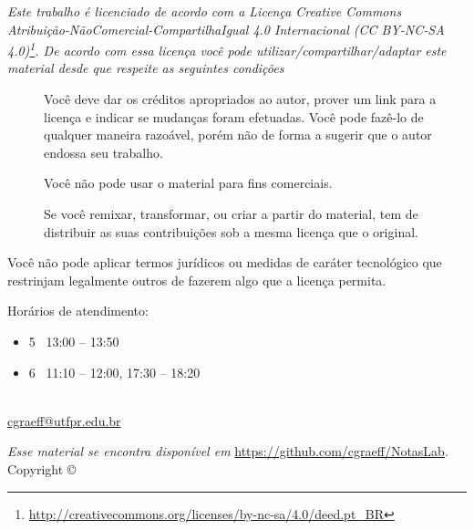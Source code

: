 \thispagestyle{empty}
\begin{center}
\Huge\ccbyncsa
\end{center}
{\it
Este trabalho é licenciado de acordo com a Licença Creative Commons  Atribuição-NãoComercial-CompartilhaIgual 4.0 Internacional  (CC BY-NC-SA 4.0)\footnote{\url{http://creativecommons.org/licenses/by-nc-sa/4.0/deed.pt_BR}}. De acordo com essa licença você pode utilizar/compartilhar/adaptar este material desde que respeite as seguintes condições
\begin{description}
	\item[\ccAttribution]Você deve dar os créditos apropriados ao autor, prover um link para a licença e indicar se mudanças foram efetuadas. Você pode fazê-lo de qualquer maneira razoável, porém não de forma a sugerir que o autor endossa seu trabalho.

    \item[\ccNonCommercial]Você não pode usar o material para fins comerciais.

    \item[\ccShareAlike]Se você remixar, transformar, ou criar a partir do material, tem de distribuir as suas contribuições sob a mesma licença que o original.
\end{description}
Você não pode aplicar termos jurídicos ou medidas de caráter tecnológico que restrinjam legalmente outros de fazerem algo que a licença permita.
}
%
\vfill
%
\begin{fullwidth}
Horários de atendimento:
\begin{itemize}
	\item 5\textordfeminine~ 13:00 -- 13:50
	\item 6\textordfeminine~ 11:10 -- 12:00, 17:30 -- 18:20
\end{itemize}
\end{fullwidth}
%
\begin{fullwidth}
\setlength{\parindent}{0pt}
\setlength{\parskip}{\baselineskip}
\thanklessauthor\\
\url{cgraeff@utfpr.edu.br}\\
\textit{\monthyear}
\end{fullwidth}
%
\vspace{1cm}
%
\begin{fullwidth}
\par\emph{Esse material se encontra disponível em} \url{https://github.com/cgraeff/NotasLab}.\\
\noindent{}Copyright \copyright\ \the\year\ \thanklessauthor
\end{fullwidth}
